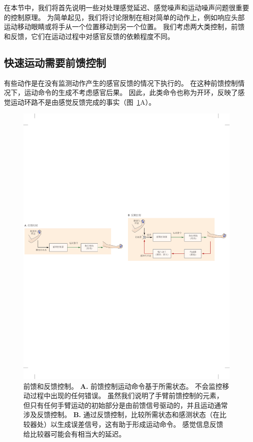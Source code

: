 在本节中，我们将首先说明一些对处理感觉延迟、感觉噪声和运动噪声问题很重要的控制原理。
为简单起见，我们将讨论限制在相对简单的动作上，例如响应头部运动移动眼睛或将手从一个位置移动到另一个位置。
我们考虑两大类控制，前馈和反馈，它们在运动过程中对感官反馈的依赖程度不同。



\subsection{快速运动需要前馈控制}

有些动作是在没有监测动作产生的感官反馈的情况下执行的。
在这种前馈控制情况下，运动命令的生成不考虑感官后果。
因此，此类命令也称为开环，反映了感觉运动环路不是由感觉反馈完成的事实（图~\ref{fig:30_2}A）。


\begin{figure}[htbp]
	\centering
	\includegraphics[width=1.0\linewidth]{chap30/fig_30_2}
	\caption{前馈和反馈控制。
		\textbf{A.} 前馈控制运动命令基于所需状态。
		不会监控移动过程中出现的任何错误。
		虽然我们说明了手臂前馈控制的元素，但只有任何手臂运动的初始部分是由前馈信号驱动的，并且运动通常涉及反馈控制。
		\textbf{B.} 通过反馈控制，比较所需状态和感测状态（在比较器处）以生成误差信号，这有助于形成运动命令。
		感觉信息反馈给比较器可能会有相当大的延迟。}
	\label{fig:30_2}
\end{figure}


